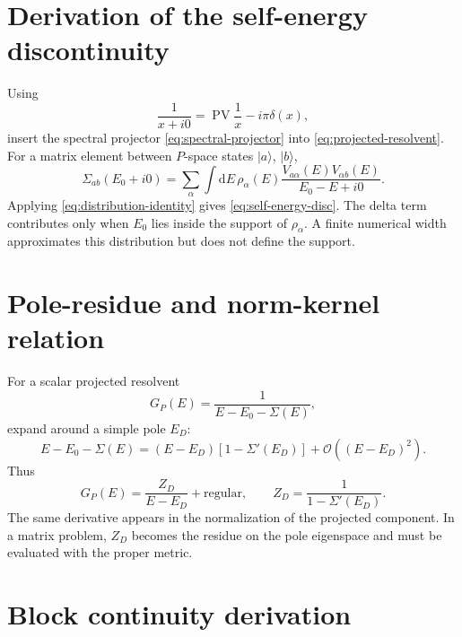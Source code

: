 \documentclass[11pt]{article}
\newcommand{\dd}{\mathrm{d}}
\newcommand{\PV}{\operatorname{PV}}
\newcommand{\cO}{\mathcal O}
\begin{document}
\appendix

\section{Derivation of the self-energy discontinuity}
\label{app:disc}

Using
\begin{equation}
 \frac{1}{x+i0}=\PV\frac1x-i\pi\delta(x),
 \label{eq:distribution-identity}
\end{equation}
insert the spectral projector \cref{eq:spectral-projector} into
\cref{eq:projected-resolvent}.  For a matrix element between \(P\)-space
states \(|a\rangle\), \(|b\rangle\),
\begin{equation}
 \Sigma_{ab}(E_0+i0)
 =\sum_\alpha\int\dd E\,
 \rho_\alpha(E)
 \frac{V_{a\alpha}(E)V_{\alpha b}(E)}{E_0-E+i0}.
 \label{eq:self-energy-app}
\end{equation}
Applying \cref{eq:distribution-identity} gives \cref{eq:self-energy-disc}.
The delta term contributes only when \(E_0\) lies inside the support of
\(\rho_\alpha\).  A finite numerical width approximates this distribution but
does not define the support.

\section{Pole-residue and norm-kernel relation}
\label{app:residue}

For a scalar projected resolvent
\begin{equation}
 G_P(E)=\frac{1}{E-E_0-\Sigma(E)},
\end{equation}
expand around a simple pole \(E_D\):
\begin{equation}
 E-E_0-\Sigma(E)
 =
 (E-E_D)\left[1-\Sigma'(E_D)\right]+ \cO((E-E_D)^2).
\end{equation}
Thus
\begin{equation}
 G_P(E)
 =\frac{Z_D}{E-E_D}+\text{regular},
 \qquad
 Z_D=\frac{1}{1-\Sigma'(E_D)}.
\end{equation}
The same derivative appears in the normalization of the projected component.
In a matrix problem, \(Z_D\) becomes the residue on the pole eigenspace and
must be evaluated with the proper metric.

\section{Block continuity derivation}
\label{app:block-continuity}
\end{document}
